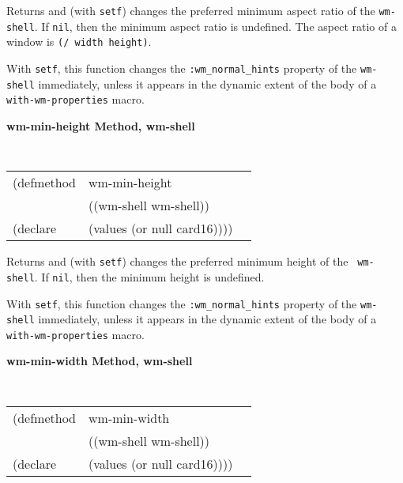 \begin{flushright} \parbox[t]{6.125in}{
Returns and (with {\tt setf}) changes the preferred minimum aspect ratio of the
{\tt wm-shell}.  If {\tt nil}, then the minimum aspect ratio is undefined. The aspect ratio of a
window is {\tt (/ width height)}.  

With {\tt setf}, this function changes the {\tt :wm\_normal\_hints} property of
the {\tt wm-shell} immediately, unless it appears in the dynamic extent of the
body of a {\tt with-wm-properties} macro.

}\end{flushright}


{\samepage
{\large {\bf wm-min-height \hfill Method, wm-shell}}
\begin{flushright} \parbox[t]{6.125in}{
\tt
\begin{tabular}{lll}
\raggedright
(defmethod & wm-min-height & \\
           & ((wm-shell  wm-shell)) \\
(declare   & (values (or null card16))))
\end{tabular}
\rm

}\end{flushright}}

\begin{flushright} \parbox[t]{6.125in}{
Returns and (with {\tt setf}) changes the preferred minimum height of the {\tt
wm-shell}. If {\tt nil}, then the minimum height is undefined. 

With {\tt setf}, this function changes the {\tt :wm\_normal\_hints} property of
the {\tt wm-shell} immediately, unless it appears in the dynamic extent of the
body of a {\tt with-wm-properties} macro.

}\end{flushright}

{\samepage
{\large {\bf wm-min-width \hfill Method, wm-shell}}
\begin{flushright} \parbox[t]{6.125in}{
\tt
\begin{tabular}{lll}
\raggedright
(defmethod & wm-min-width & \\
           & ((wm-shell  wm-shell)) \\
(declare   & (values (or null card16))))
\end{tabular}
\rm

}\end{flushright}}

